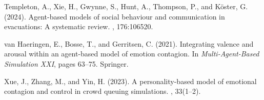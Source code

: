 \documentclass[a4paper,twoside]{article}
\begin{document}
{\begin{thebibliography}{}
Templeton, A., Xie, H., Gwynne, S., Hunt, A., Thompson, P., and Köster, G. (2024).
\newblock Agent-based models of social behaviour and communication in evacuations: A systematic review.
, 176:106520.

van Haeringen, E., Bosse, T., and Gerritsen, C. (2021).
\newblock Integrating valence and arousal within an agent-based model of emotion contagion.
\newblock In {\em Multi-Agent-Based Simulation XXI}, pages 63--75. Springer.

Xue, J., Zhang, M., and Yin, H. (2023).
\newblock A personality-based model of emotional contagion and control in crowd queuing simulations.
, 33(1–2).

\end{thebibliography}
}
\end{document}
